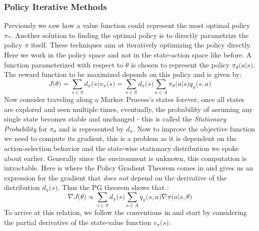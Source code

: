 \documentclass[12pt]{extarticle}
\numberwithin{equation}{section}
\begin{document}
	\subsubsection{Policy Iterative Methods}\label{policy_methods}
	Previously we saw how a value function could represent the most optimal policy $\pi_*$. Another solution to finding the optimal policy is to directly parametrize the policy $\pi$ itself. These techniques aim at iteratively optimizing the policy directly. Here we work in the policy space and not in the state-action space like before. A function parameterized with respect to $\theta$  is chosen to represent 
	the policy $\pi_{\theta}\big(a|s\big)$. The reward function to be maximized depends on this policy and is given by: 
	\begin{equation}
	J\big(\theta\big) = \sum_{s \in S} d_{\pi}\big(s\big)v_{\pi}\big(s\big) =\sum_{s \in S} d_{\pi}\big(s\big) \sum_{a \in A} \pi_{\theta}\big(a|s\big)q_{\pi}\big(s,a\big)
	\end{equation}
	Now consider traveling along a Markov Process's states forever, once all states are explored and seen multiple times, eventually, the probability of assuming any single state becomes stable and unchanged - this is called the \textit{Stationary Probability} for $\pi_{\theta}$ and is represented by $d_{\pi}$. Now to improve the objective function we need to compute its gradient, this is a problem as it is dependent on the action-selection behavior and the state-wise stationary distribution we spoke about earlier. Generally since the environment is unknown, this computation is intractable. Here is where the Policy Gradient Theorem comes in and gives us an expression for the gradient that \textit{does not} depend on the derivative of the distribution $d_{\pi}\big(s\big)$. Thus the PG theorem shows that :
	\begin{equation}
	\nabla J\big(\theta\big) \propto \sum_{s \in S} d_{\pi}\big(s\big) \sum_{a \in A}q_{\pi}\big(s,a\big) \nabla \pi\big(a|s,\theta\big)
	\end{equation}
	To arrive at this relation, we follow the conventions in \cite{Sutton-introRL} and start by considering the partial derivative of the state-value function $v_\pi\big(s\big)$:
\end{document}
